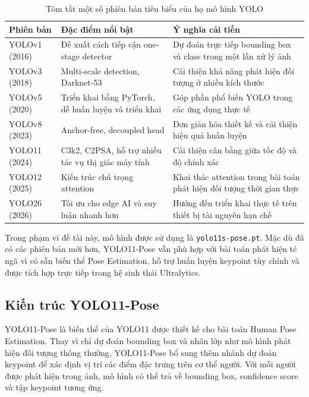 \documentclass[12pt, a4paper]{article}
\begin{document}
\begin{table}[H]
  \centering
  \caption{Tóm tắt một số phiên bản tiêu biểu của họ mô hình YOLO}
  \label{tab:yolo_history}
  \begin{tabularx}{\textwidth}{@{}l>{\raggedright\arraybackslash}X>{\raggedright\arraybackslash}X@{}}
    \toprule
    \textbf{Phiên bản} & \textbf{Đặc điểm nổi bật} & \textbf{Ý nghĩa cải tiến} \\
    \midrule
    YOLOv1 (2016) & Đề xuất cách tiếp cận one-stage detector & Dự đoán trực tiếp bounding box và class trong một lần xử lý ảnh \\
    YOLOv3 (2018) & Multi-scale detection, Darknet-53 & Cải thiện khả năng phát hiện đối tượng ở nhiều kích thước \\
    YOLOv5 (2020) & Triển khai bằng PyTorch, dễ huấn luyện và triển khai & Góp phần phổ biến YOLO trong các ứng dụng thực tế \\
    YOLOv8 (2023) & Anchor-free, decoupled head & Đơn giản hóa thiết kế và cải thiện hiệu quả huấn luyện \\
    YOLO11 (2024) & C3k2, C2PSA, hỗ trợ nhiều tác vụ thị giác máy tính & Cải thiện cân bằng giữa tốc độ và độ chính xác \\
    YOLO12 (2025) & Kiến trúc chú trọng attention & Khai thác attention trong bài toán phát hiện đối tượng thời gian thực \\
    YOLO26 (2026) & Tối ưu cho edge AI và suy luận nhanh hơn & Hướng đến triển khai thực tế trên thiết bị tài nguyên hạn chế \\
    \bottomrule
  \end{tabularx}
\end{table}

Trong phạm vi đề tài này, mô hình được sử dụng là \texttt{yolo11s-pose.pt}.
Mặc dù đã có các phiên bản mới hơn, YOLO11-Pose vẫn phù hợp với bài toán phát hiện té ngã vì có sẵn biến thể Pose Estimation, hỗ trợ huấn luyện keypoint tùy chỉnh và được tích hợp trực tiếp trong hệ sinh thái Ultralytics.

\subsection{Kiến trúc YOLO11-Pose}
\label{subsec:yolo11_arch}

YOLO11-Pose là biến thể của YOLO11 được thiết kế cho bài toán Human Pose Estimation.
Thay vì chỉ dự đoán bounding box và nhãn lớp như mô hình phát hiện đối tượng thông thường, YOLO11-Pose bổ sung thêm nhánh dự đoán keypoint để xác định vị trí các điểm đặc trưng trên cơ thể người.
Với mỗi người được phát hiện trong ảnh, mô hình có thể trả về bounding box, confidence score và tập keypoint tương ứng.
\end{document}
